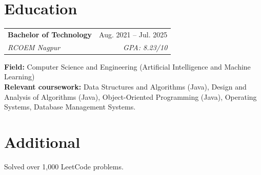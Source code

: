 \documentclass[a4paper,11pt]{article}
\begin{document}
\section{Education}
\begin{tabularx}{\textwidth}{@{}Xr@{}}
  \textbf{Bachelor of Technology} & Aug. 2021 -- Jul. 2025 \\
  \textit{\small RCOEM Nagpur} & \textit{\small GPA: 8.23/10} \\
\end{tabularx}
\small\textbf{Field:} Computer Science and Engineering (Artif{}icial Intelligence and Machine Learning)\\
\small\textbf{Relevant coursework:} Data Structures and Algorithms (Java), Design and Analysis of Algorithms (Java), Object-Oriented Programming (Java), Operating Systems, Database Management Systems.

\section{Additional}
\small Solved over 1,000 LeetCode problems.
\end{document}
